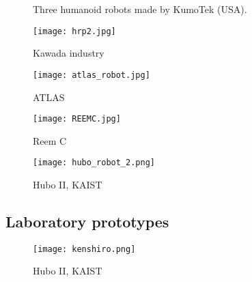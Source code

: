\begin{figure}[]
\centering
    \hfil
    \hfil
    \caption{Three humanoid robots made by KumoTek (USA).}
    \label{fig:kumotek_robots}
\end{figure}

\begin{figure}[]
    \begin{center}
        \texttt{[image: hrp2.jpg]}
    \end{center}
    \caption{Kawada industry}
    \label{fig:hrp2_robot}
\end{figure}

\begin{figure}[]
    \begin{center}
        \texttt{[image: atlas\_robot.jpg]}
    \end{center}
    \caption{ATLAS}
    \label{fig:atlas_robot}
\end{figure}


\begin{figure}[]
    \begin{center}
        \texttt{[image: REEMC.jpg]}
    \end{center}
    \caption{Reem C }
    \label{fig:reem_c_robot}
\end{figure}

\begin{figure}[]
    \begin{center}
        \texttt{[image: hubo\_robot\_2.png]}
    \end{center}
    \caption{Hubo II, KAIST}
    \label{fig:hubo_robot}
\end{figure}


\subsection{Laboratory prototypes} %

\begin{figure}[]
    \begin{center}
        \texttt{[image: kenshiro.png]}
    \end{center}
    \caption{Hubo II, KAIST}
    \label{fig:kenshiro_robot}
\end{figure}


